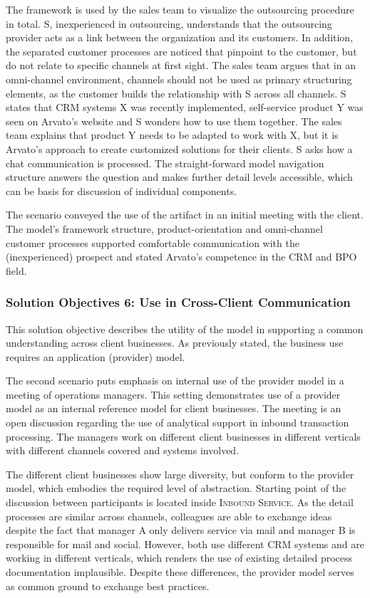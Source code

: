 The framework is used by the sales team to visualize the outsourcing procedure in total. S, inexperienced in outsourcing, understands that the outsourcing provider acts as a link between the organization and its customers. In addition, the separated customer processes are noticed that pinpoint to the customer, but do not relate to specific channels at first sight. The sales team argues that in an omni-channel environment, channels should not be used as primary structuring elements, as the customer builds the relationship with S across all channels. S states that CRM systems X was recently implemented, self-service product Y was seen on Arvato's website and S wonders how to use them together. The sales team explains that product Y needs to be adapted to work with X, but it is Arvato's approach to create customized solutions for their clients. S asks how a chat communication is processed. The straight-forward model navigation structure answers the question and makes further detail levels accessible, which can be basis for discussion of individual components. 

The scenario conveyed the use of the artifact in an initial meeting with the client. The model's framework structure, product-orientation and omni-channel customer processes supported comfortable communication with the (inexperienced) prospect and stated Arvato's competence in the CRM and BPO field.

\subsubsection{Solution Objectives 6: Use in Cross-Client Communication}
This solution objective describes the utility of the model in supporting a common understanding across client businesses. As previously stated, the business use requires an application (provider) model.  

The second scenario puts emphasis on internal use of the provider model in a meeting of operations managers. This setting demonstrates use of a provider model as an internal reference model for client businesses. The meeting is an open discussion regarding the use of analytical support in inbound transaction processing. The managers work on different client businesses in different verticals with different channels covered and systems involved. %

The different client businesses show large diversity, but conform to the provider model, which embodies the required level of abstraction. Starting point of the discussion between participants is located inside \textsc{Inbound Service}. As the detail processes are similar across channels, colleagues are able to exchange ideas despite the fact that manager A only delivers service via mail and manager B is responsible for mail and social. However, both use different CRM systems and are working in different verticals, which renders the use of existing detailed process documentation implausible. Despite these differences, the provider model serves as common ground to exchange best practices. 


